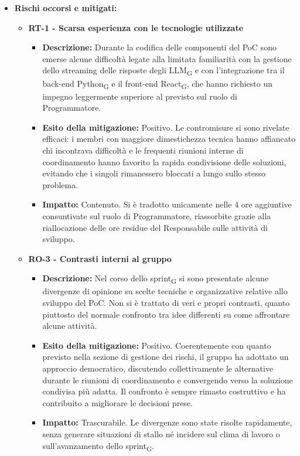 \documentclass[a4paper, 10pt, colorlinks=true, linkcolor=black, urlcolor=blue, citecolor=blue, hidelinks]{article}
\begin{document}
\begin{itemize}
    \item \textbf{Rischi occorsi e mitigati:}
    \begin{itemize}
        \item \textbf{RT-1 - Scarsa esperienza con le tecnologie utilizzate}
        \begin{itemize}
            \item \textbf{Descrizione:} Durante la codifica delle componenti del PoC sono emerse alcune difficoltà legate alla limitata familiarità con la gestione dello streaming delle risposte degli LLM\textsubscript{G} e con l'integrazione tra il back-end Python\textsubscript{G} e il front-end React\textsubscript{G}, che hanno richiesto un impegno leggermente superiore al previsto sul ruolo di Programmatore.
            \item \textbf{Esito della mitigazione:} Positivo. Le contromisure si sono rivelate efficaci: i membri con maggiore dimestichezza tecnica hanno affiancato chi incontrava difficoltà e le frequenti riunioni interne di coordinamento hanno favorito la rapida condivisione delle soluzioni, evitando che i singoli rimanessero bloccati a lungo sullo stesso problema.
            \item \textbf{Impatto:} Contenuto. Si è tradotto unicamente nelle 4 ore aggiuntive consuntivate sul ruolo di Programmatore, riassorbite grazie alla riallocazione delle ore residue del Responsabile sulle attività di sviluppo.
        \end{itemize}
        \item \textbf{RO-3 - Contrasti interni al gruppo}
        \begin{itemize}
            \item \textbf{Descrizione:} Nel corso dello sprint\textsubscript{G} si sono presentate alcune divergenze di opinione su scelte tecniche e organizzative relative allo sviluppo del PoC. Non si è trattato di veri e propri contrasti, quanto piuttosto del normale confronto tra idee differenti su come affrontare alcune attività.
            \item \textbf{Esito della mitigazione:} Positivo. Coerentemente con quanto previsto nella sezione di gestione dei rischi, il gruppo ha adottato un approccio democratico, discutendo collettivamente le alternative durante le riunioni di coordinamento e convergendo verso la soluzione condivisa più adatta. Il confronto è sempre rimasto costruttivo e ha contribuito a migliorare le decisioni prese.
            \item \textbf{Impatto:} Trascurabile. Le divergenze sono state risolte rapidamente, senza generare situazioni di stallo né incidere sul clima di lavoro o sull'avanzamento dello sprint\textsubscript{G}.
        \end{itemize}
    \end{itemize}
\end{itemize}
\end{document}
